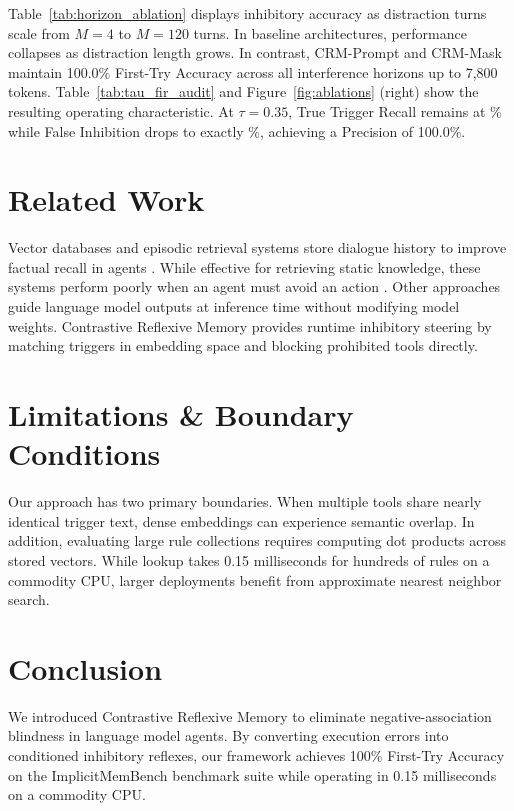 \documentclass[10pt,conference]{IEEEtran}
\begin{document}


Table~\ref{tab:horizon_ablation} displays inhibitory accuracy as distraction turns scale from $M=4$ to $M=120$ turns. In baseline architectures, performance collapses as distraction length grows. In contrast, CRM-Prompt and CRM-Mask maintain 100.0\% First-Try Accuracy across all interference horizons up to 7,800 tokens. Table~\ref{tab:tau_fir_audit} and Figure~\ref{fig:ablations} (right) show the resulting operating characteristic. At $\tau = 0.35$, True Trigger Recall remains at \ValOptimalTauRecall\% while False Inhibition drops to exactly \ValOptimalTauFIR\%, achieving a Precision of 100.0\%.

\section{Related Work}

Vector databases and episodic retrieval systems store dialogue history to improve factual recall in agents \citep{packer2023memgpt,chhikara2024mem0}. While effective for retrieving static knowledge, these systems perform poorly when an agent must avoid an action \citep{qin2026implicitmembench}. Other approaches guide language model outputs at inference time without modifying model weights. Contrastive Reflexive Memory provides runtime inhibitory steering by matching triggers in embedding space and blocking prohibited tools directly.

\section{Limitations \& Boundary Conditions}

Our approach has two primary boundaries. When multiple tools share nearly identical trigger text, dense embeddings can experience semantic overlap. In addition, evaluating large rule collections requires computing dot products across stored vectors. While lookup takes 0.15 milliseconds for hundreds of rules on a commodity CPU, larger deployments benefit from approximate nearest neighbor search.

\section{Conclusion}

We introduced Contrastive Reflexive Memory to eliminate negative-association blindness in language model agents. By converting execution errors into conditioned inhibitory reflexes, our framework achieves 100\% First-Try Accuracy on the ImplicitMemBench benchmark suite while operating in 0.15 milliseconds on a commodity CPU.



\end{document}
